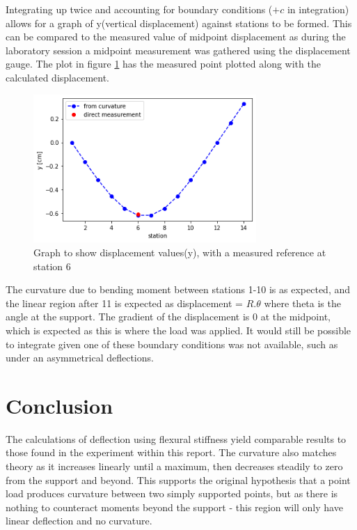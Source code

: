 \documentclass[12pt]{article}
\begin{document}
        Integrating up twice and accounting for boundary conditions ($+c$ in integration) allows for a graph of y(vertical displacement) against stations to be formed. This can be
        compared to the measured value of midpoint displacement as during the laboratory session a midpoint measurement was gathered using the displacement gauge. The plot in 
        figure \ref{y_station_final} has the measured point plotted along with the calculated displacement.
        \begin{figure}[H]
            \centering
            \captionsetup{labelfont=bf}
            \includegraphics[width=20pc]{y_station_final.png}
            \caption{Graph to show displacement values(y), with a measured reference at station 6}\label{y_station_final}
        \end{figure}
        The curvature due to bending moment between stations 1-10 is as expected, and the linear region after 11 is expected as displacement = $R.\theta$ where theta is the angle
        at the support. The gradient of the displacement is 0 at the midpoint, which is expected as this is where the load was applied. It would still be possible to integrate
        given one of these boundary conditions was not available, such as under an asymmetrical deflections. 
    \section{Conclusion}
        The calculations of deflection using flexural stiffness yield comparable results to those found in the experiment within this report. The curvature also matches theory
        as it increases linearly until a maximum, then decreases steadily to zero from the support and beyond. This supports the original hypothesis that a point load produces
        curvature between two simply supported points, but as there is nothing to counteract moments beyond the support - this region will only have linear deflection and no
        curvature.
\end{document}
